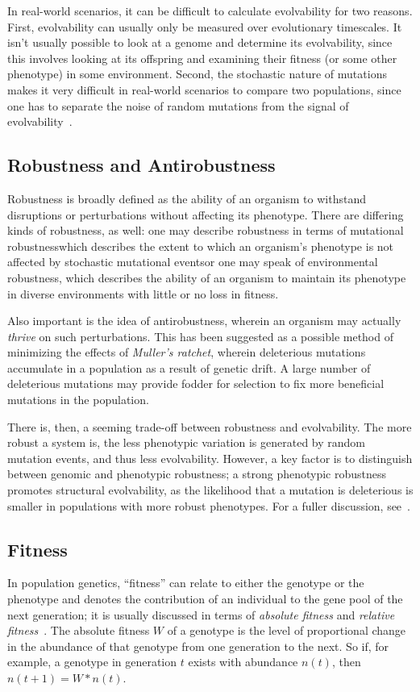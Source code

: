 In real-world scenarios, it can be difficult to calculate evolvability for two reasons. First, evolvability can usually only be measured over evolutionary timescales. It isn't usually possible to look at a genome and determine its evolvability, since this involves looking at its offspring and examining their fitness (or some other phenotype) in some environment. Second, the stochastic nature of mutations makes it very difficult in real-world scenarios to compare two populations, since one has to separate the noise of random mutations from the signal of evolvability~\cite{selectionEvolvability}. 

\subsection{Robustness and Antirobustness}\label{subsec:robustness_antirobustness}
Robustness is broadly defined as the ability of an organism to withstand disruptions or perturbations without affecting its phenotype. There are differing kinds of robustness, as well: one may describe robustness in terms of mutational robustness\textendash which describes the extent to which an organism's phenotype is not affected by stochastic mutational events\textendash or one may speak of environmental robustness, which describes the ability of an organism to maintain its phenotype in diverse environments with little or no loss in fitness. 

Also important is the idea of antirobustness, wherein an organism may actually \textit{thrive} on such perturbations. This has been suggested as a possible method of minimizing the effects of \textit{Muller's ratchet}, wherein deleterious mutations accumulate in a population as a result of genetic drift\cite{Gordo2137}. A large number of deleterious mutations may provide fodder for selection to fix more beneficial mutations in the population\cite{doi:10.1186/s12862-019-1507-z}.

There is, then, a seeming trade-off between robustness and evolvability. The more robust a system is, the less phenotypic variation is generated by random mutation events, and thus less evolvability. However, a key factor is to distinguish between genomic and phenotypic robustness; a strong phenotypic robustness promotes structural evolvability, as the likelihood that a mutation is deleterious is smaller in populations with more robust phenotypes. For a fuller discussion, see~\cite{doi:10.1098/rspb.2007.1137}.

\subsection{Fitness}\label{background:fitness}
In population genetics, ``fitness'' can relate to either the genotype or the phenotype and denotes the contribution of an individual to the gene pool of the next generation; it is usually discussed in terms of \textit{absolute fitness} and \textit{relative fitness}~\cite{cutter2019primer}. The absolute fitness $W$ of a genotype is the level of proportional change in the abundance of that genotype from one generation to the next. So if, for example, a genotype in generation $t$ exists with abundance $n(t)$, then $n(t+1) = W*n(t)$. 


